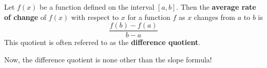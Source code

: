 \documentclass{book}
\begin{document}
\begin{Def} Let $f(x)$ be a function defined on the interval $[a,b]$. Then the \textbf{average rate of change} of $f(x)$ with respect to $x$ for a function $f$ as $x$ changes from $a$ to $b$ is 
\begin{equation} \dfrac{f(b) - f(a)}{b-a}\end{equation} This quotient is often referred to as the \textbf{difference  quotient}.
\end{Def}\vs

Now, the difference quotient is none other than the slope formula!%
\end{document}
